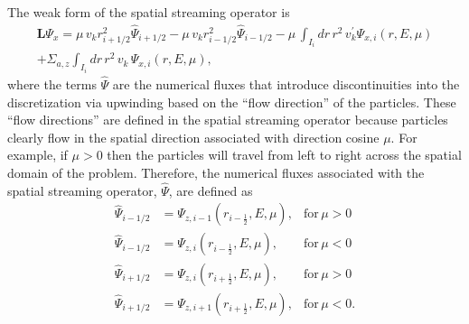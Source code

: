 \documentclass[../main.tex]{subfiles}
\begin{document}
The weak form of the spatial streaming operator is 
\begin{multline} \label{eqn:spatial-weak-form}
    \boldsymbol{L} \Psi_x = \mu \, v_k r_{i+1/2}^2 \widehat{\Psi}_{i+1/2} - \mu \, v_k r_{i-1/2}^2 \widehat{\Psi}_{i-1/2} - \mu \, \int_{I_i} dr \, r^2 \, v_k^{\prime} \Psi_{x,i}(r,E,\mu) \\ 
    + \Sigma_{a,z} \int_{I_i} dr \, r^2 \, v_k \, \Psi_{x,i}(r,E,\mu),
\end{multline}
where the terms $\widehat{\Psi}$ are the numerical fluxes that introduce discontinuities into the discretization via upwinding based on the ``flow direction'' of the particles. These ``flow directions'' are defined in the spatial streaming operator because particles clearly flow in the spatial direction associated with direction cosine $\mu$. For example, if $\mu > 0$ then the particles will travel from left to right across the spatial domain of the problem. Therefore, the numerical fluxes associated with the spatial streaming operator, $\widehat{\Psi}$, are defined as
\begin{subequations} \label{eqn:spatial-upwinding}
    \begin{align}
        \widehat{\Psi}_{i-1/2} &= \Psi_{z,i-1}(r_{i-\frac{1}{2}},E,\mu),  &\text{for} \, \mu > 0 \\
        \widehat{\Psi}_{i-1/2} &= \Psi_{z,i}(r_{i-\frac{1}{2}},E,\mu),  &\text{for} \, \mu < 0 \\
        \widehat{\Psi}_{i+1/2} &= \Psi_{z,i}(r_{i+\frac{1}{2}},E,\mu),  &\text{for} \, \mu > 0 \\
        \widehat{\Psi}_{i+1/2} &= \Psi_{z,i+1}(r_{i+\frac{1}{2}},E,\mu),  &\text{for} \, \mu < 0.
    \end{align}
\end{subequations}
\end{document}
